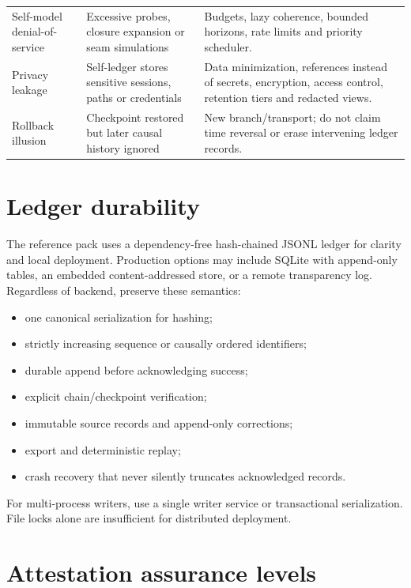 \documentclass[11pt,oneside]{report}
\begin{document}
\begin{longtable}{@{}L{1.40in}L{2.20in}L{2.85in}@{}}
Self-model denial-of-service & Excessive probes, closure expansion or seam simulations & Budgets, lazy coherence, bounded horizons, rate limits and priority scheduler. \\
Privacy leakage & Self-ledger stores sensitive sessions, paths or credentials & Data minimization, references instead of secrets, encryption, access control, retention tiers and redacted views. \\
Rollback illusion & Checkpoint restored but later causal history ignored & New branch/transport; do not claim time reversal or erase intervening ledger records. \\
\bottomrule
\end{longtable}

\section{Ledger durability}

The reference pack uses a dependency-free hash-chained JSONL ledger for clarity and local deployment. Production options may include SQLite with append-only tables, an embedded content-addressed store, or a remote transparency log. Regardless of backend, preserve these semantics:

\begin{itemize}
  \item one canonical serialization for hashing;
  \item strictly increasing sequence or causally ordered identifiers;
  \item durable append before acknowledging success;
  \item explicit chain/checkpoint verification;
  \item immutable source records and append-only corrections;
  \item export and deterministic replay;
  \item crash recovery that never silently truncates acknowledged records.
\end{itemize}

For multi-process writers, use a single writer service or transactional serialization. File locks alone are insufficient for distributed deployment.

\section{Attestation assurance levels}
\end{document}
